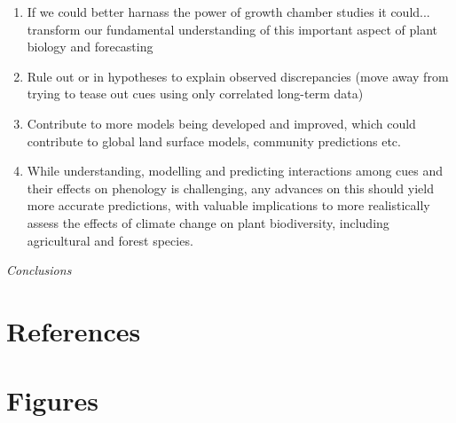 \documentclass[11pt,letter]{article}
\begin{document}
\begin{enumerate}
\begin{enumerate}
\item If we could better harnass the power of growth chamber studies it could... transform our fundamental understanding of this important aspect of plant biology and forecasting
\item Rule out or in hypotheses to explain observed discrepancies (move away from trying to tease out cues using only correlated long-term data)
\item Contribute to more models being developed and improved, which could contribute to global land surface models, community predictions etc. 
\item While understanding, modelling and predicting interactions among cues and their effects on phenology is challenging, any advances on this should yield more accurate predictions, with valuable implications to more realistically assess the effects of climate change on plant biodiversity, including agricultural and forest species. %
\end{enumerate}
\end{enumerate}



\emph{Conclusions}

\section{References}



\section{Figures}
\end{document}
